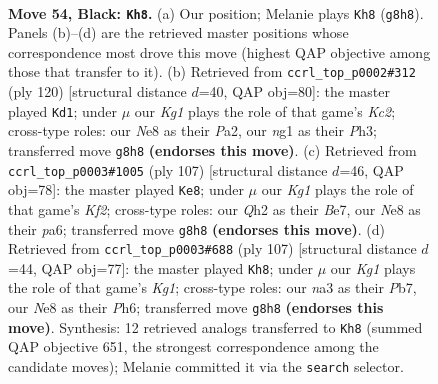 \documentclass[11pt]{article}
\begin{document}
\clearpage

\begin{figure}[p]\centering
\begin{subfigure}{0.46\textwidth}\centering
\resizebox{\linewidth}{!}{%
\newchessgame
\chessboard[
  setfen={4n1k1/5Q2/p3P3/3P1p1p/b5p1/N7/5P1q/5KN1 b - - 4 54},
  showmover=false,
  pgfstyle=straightmove, color=movearrow, markmove={g8-h8}
]}
\caption{}
\end{subfigure}\hfill
\begin{subfigure}{0.46\textwidth}\centering
\resizebox{\linewidth}{!}{%
\newchessgame
\chessboard[
  setfen={8/5Q2/1p3ppk/8/1p5p/1Pq4P/P1K1B3/8 w - - 42 61},
  showmover=false,
  pgfstyle=straightmove, color=movearrow, markmove={c2-d1}
]}
\caption{}
\end{subfigure}
\\[4pt]
\begin{subfigure}{0.46\textwidth}\centering
\resizebox{\linewidth}{!}{%
\newchessgame
\chessboard[
  setfen={8/4bk2/P2pQ3/2pPp3/2P1Pp2/8/6PK/4q3 b - - 2 54},
  showmover=false,
  pgfstyle=straightmove, color=movearrow, markmove={f7-e8}
]}
\caption{}
\end{subfigure}\hfill
\begin{subfigure}{0.46\textwidth}\centering
\resizebox{\linewidth}{!}{%
\newchessgame
\chessboard[
  setfen={6k1/1p3Q2/p1b1Pp1p/5P2/4q3/2P4K/PP6/8 b - - 3 54},
  showmover=false,
  pgfstyle=straightmove, color=movearrow, markmove={g8-h8}
]}
\caption{}
\end{subfigure}
\caption{\textbf{Move 54, Black: \texttt{Kh8}.} (a) Our position; Melanie plays \texttt{Kh8} (\texttt{g8h8}). Panels (b)--(d) are the retrieved master positions whose correspondence most drove this move (highest QAP objective among those that transfer to it). (b) Retrieved from \texttt{ccrl\_top\_p0002\#312} (ply 120) [structural distance $d$=40, QAP obj=80]: the master played \texttt{Kd1}; under $\mu$ our \emph{Kg1} plays the role of that game's \emph{Kc2}; cross-type roles: our \emph{N}e8 as their \emph{P}a2, our \emph{n}g1 as their \emph{P}h3; transferred move \texttt{g8h8} \textbf{(endorses this move)}. (c) Retrieved from \texttt{ccrl\_top\_p0003\#1005} (ply 107) [structural distance $d$=46, QAP obj=78]: the master played \texttt{Ke8}; under $\mu$ our \emph{Kg1} plays the role of that game's \emph{Kf2}; cross-type roles: our \emph{Q}h2 as their \emph{B}e7, our \emph{N}e8 as their \emph{p}a6; transferred move \texttt{g8h8} \textbf{(endorses this move)}. (d) Retrieved from \texttt{ccrl\_top\_p0003\#688} (ply 107) [structural distance $d$=44, QAP obj=77]: the master played \texttt{Kh8}; under $\mu$ our \emph{Kg1} plays the role of that game's \emph{Kg1}; cross-type roles: our \emph{n}a3 as their \emph{P}b7, our \emph{N}e8 as their \emph{P}h6; transferred move \texttt{g8h8} \textbf{(endorses this move)}. Synthesis: 12 retrieved analogs transferred to \texttt{Kh8} (summed QAP objective 651, the strongest correspondence among the candidate moves); Melanie committed it via the \texttt{search} selector.}
\label{fig:thought-m107}
\end{figure}
\end{document}
